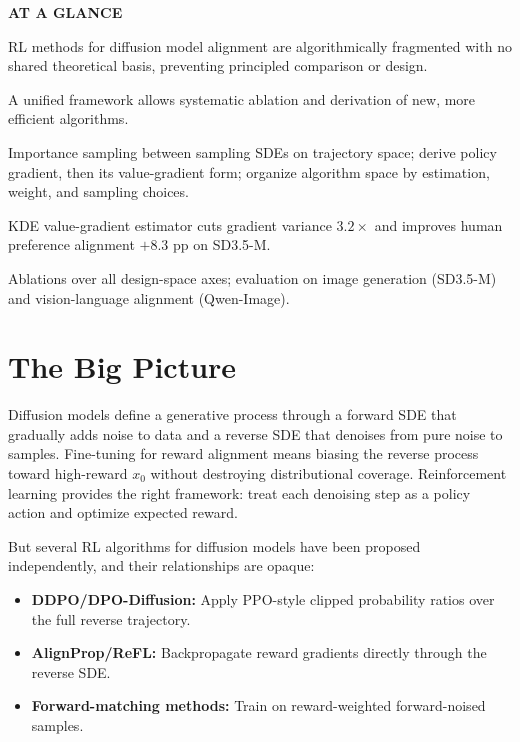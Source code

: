 \documentclass[10pt,twocolumn]{article}
\begin{document}
\begin{mdframed}[backgroundcolor=boxgray,linecolor=rulered,linewidth=1pt,
    innerleftmargin=6pt,innerrightmargin=6pt,
    innertopmargin=6pt,innerbottommargin=6pt]
\textbf{\small AT A GLANCE}\par\vspace{4pt}
\begin{description}[leftmargin=0pt,labelsep=4pt,itemsep=2pt,parsep=0pt,
    font=\small\bfseries]
  \item[Problem:] RL methods for diffusion model alignment are
    algorithmically fragmented with no shared theoretical basis,
    preventing principled comparison or design.
  \item[Why it matters:] A unified framework allows systematic ablation
    and derivation of new, more efficient algorithms.
  \item[Method:] Importance sampling between sampling SDEs on trajectory
    space; derive policy gradient, then its value-gradient form; organize
    algorithm space by estimation, weight, and sampling choices.
  \item[Result:] KDE value-gradient estimator cuts gradient variance
    $3.2\times$ and improves human preference alignment $+8.3$ pp
    on SD3.5-M.
  \item[Evidence:] Ablations over all design-space axes; evaluation on
    image generation (SD3.5-M) and vision-language alignment (Qwen-Image).
\end{description}
\end{mdframed}

\section{The Big Picture}

Diffusion models define a generative process through a forward SDE that
gradually adds noise to data and a reverse SDE that denoises from pure
noise to samples. Fine-tuning for reward alignment means biasing the
reverse process toward high-reward $x_0$ without destroying distributional
coverage. Reinforcement learning provides the right framework: treat each
denoising step as a policy action and optimize expected reward.

But several RL algorithms for diffusion models have been proposed
independently, and their relationships are opaque:
\begin{itemize}[itemsep=1pt,parsep=0pt]
  \item \textbf{DDPO/DPO-Diffusion:} Apply PPO-style clipped probability
    ratios over the full reverse trajectory.
  \item \textbf{AlignProp/ReFL:} Backpropagate reward gradients directly
    through the reverse SDE.
  \item \textbf{Forward-matching methods:} Train on reward-weighted
    forward-noised samples.
\end{itemize}
\end{document}
